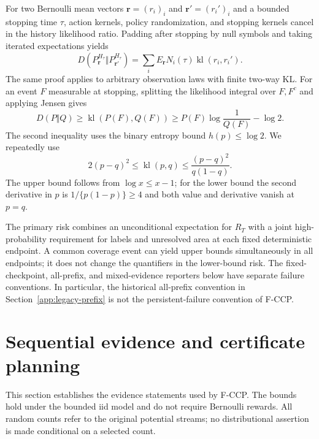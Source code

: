\documentclass[11pt]{article}
\theoremstyle{remark}
\begin{document}
For two Bernoulli mean vectors $\boldsymbol r=(r_i)_i$ and
$\boldsymbol r'=(r_i')_i$ and a bounded stopping time $\tau$, action
kernels, policy randomization, and stopping kernels cancel in the history
likelihood ratio. Padding after stopping by null symbols and taking iterated
expectations yields
\begin{equation}
 D(P_{\boldsymbol r}^{H_\tau}\Vert P_{\boldsymbol r'}^{H_\tau})
 =\sum_iE_{\boldsymbol r} N_i(\tau)\operatorname{kl}(r_i,r_i').
 \label{eq:app_kl_identity}
\end{equation}
The same proof applies to arbitrary observation laws with finite two-way KL.
For an event $F$ measurable at stopping, splitting the likelihood integral
over $F,F^c$ and applying Jensen gives
\[
 D(P\Vert Q)\ge\operatorname{kl}(P(F),Q(F))
 \ge P(F)\log\frac1{Q(F)}-\log2.
\]
The second inequality uses the binary entropy bound $h(p)\le\log2$. We repeatedly use
\[
 2(p-q)^2\le\operatorname{kl}(p,q)
 \le\frac{(p-q)^2}{q(1-q)}.
\]
The upper bound follows from $\log x\le x-1$; for the lower bound the second
derivative in $p$ is $1/\{p(1-p)\}\ge4$ and both value and derivative vanish
at $p=q$.


The primary risk combines an unconditional expectation for $R_T$ with a
joint high-probability requirement for labels and unresolved area at each
fixed deterministic endpoint. A common coverage event can yield upper
bounds simultaneously in all endpoints; it does not change the quantifiers
in the lower-bound risk. The fixed-checkpoint, all-prefix, and mixed-evidence
reporters below have separate failure conventions. In particular, the
historical all-prefix convention in Section~\ref{app:legacy-prefix} is not
the persistent-failure convention of F-CCP.
\section{Sequential evidence and certificate planning}\label{app:fccp-evidence}
This section establishes the evidence statements used by F-CCP. The
bounds hold under the bounded iid model and do not require Bernoulli
rewards. All random counts refer to the original potential streams;
no distributional assertion is made conditional on a selected count.
\end{document}
